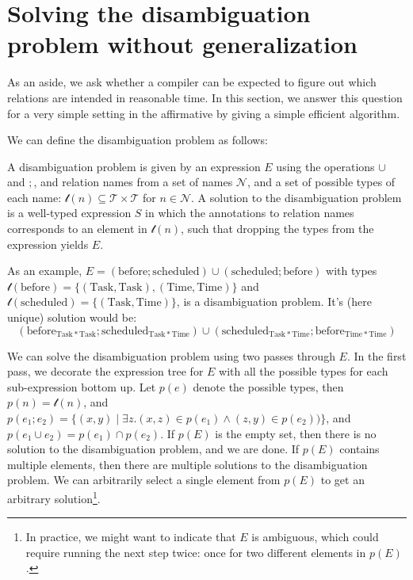 \documentclass[12pt]{article}
\begin{document}
\section{Solving the disambiguation problem without generalization}
As an aside, we ask whether a compiler can be expected to figure out which relations are intended in reasonable time. In this section, we answer this question for a very simple setting in the affirmative by giving a simple efficient algorithm.

We can define the disambiguation problem as follows:

A disambiguation problem is given by an expression $E$ using the operations $\cup$ and $;$, and relation names from a set of names $\mathcal{N}$, and a set of possible types of each name: $\mathcal{t}(n) \subseteq \mathcal{T}\times \mathcal{T}$ for $n\in \mathcal{N}$.
A solution to the disambiguation problem is a well-typed expression $S$ in which the annotations to relation names corresponds to an element in $\mathcal{t}(n)$, such that dropping the types from the expression yields $E$.

As an example, $E = (\mathrm{before};\mathrm{scheduled}) \cup (\mathrm{scheduled};\mathrm{before})$ with types $\mathcal{t}(\mathrm{before}) = \{(\mathrm{Task}, \mathrm{Task}),(\mathrm{Time}, \mathrm{Time})\}$ and $\mathcal{t}(\mathrm{scheduled}) = \{(\mathrm{Task}, \mathrm{Time})\}$, is a disambiguation problem.
It's (here unique) solution would be:
\[\left(\mathrm{before}_{\mathrm{Task * Task}};\mathrm{scheduled}_{\mathrm{Task * Time}}\right) \cup \left(\mathrm{scheduled}_{\mathrm{Task * Time}};\mathrm{before}_{\mathrm{Time * Time}}\right)\]

We can solve the disambiguation problem using two passes through $E$.
In the first pass, we decorate the expression tree for $E$ with all the possible types for each sub-expression bottom up.
Let $p(e)$ denote the possible types, then $p(n) = \mathcal{t}(n)$, and $p(e_1;e_2) = \{(x,y) \mid \exists z. (x,z) \in p(e_1) \wedge (z,y) \in p(e_2))\}$, and $p(e_1 \cup e_2) = p(e_1) \cap p(e_2)$.
If $p(E)$ is the empty set, then there is no solution to the disambiguation problem, and we are done.
If $p(E)$ contains multiple elements, then there are multiple solutions to the disambiguation problem.
We can arbitrarily select a single element from $p(E)$ to get an arbitrary solution\footnote{In practice, we might want to indicate that $E$ is ambiguous, which could require running the next step twice: once for two different elements in $p(E)$.}.
\end{document}
